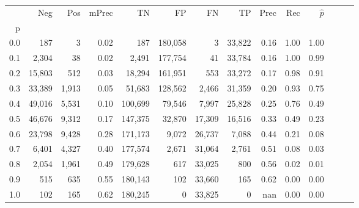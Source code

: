 \begin{tabular}{rrrrrrrrrrrrrr}
\toprule
{} &     Neg &    Pos & mPrec &       TN &       FP &      FN &      TP &  Prec &   Rec & $\hat{p}$ \\
p   &         &        &       &          &          &         &         &       &       &           \\
\midrule
0.0 &     187 &      3 &  0.02 &      187 &  180,058 &       3 &  33,822 &  0.16 &  1.00 &      1.00 \\
0.1 &   2,304 &     38 &  0.02 &    2,491 &  177,754 &      41 &  33,784 &  0.16 &  1.00 &      0.99 \\
0.2 &  15,803 &    512 &  0.03 &   18,294 &  161,951 &     553 &  33,272 &  0.17 &  0.98 &      0.91 \\
0.3 &  33,389 &  1,913 &  0.05 &   51,683 &  128,562 &   2,466 &  31,359 &  0.20 &  0.93 &      0.75 \\
0.4 &  49,016 &  5,531 &  0.10 &  100,699 &   79,546 &   7,997 &  25,828 &  0.25 &  0.76 &      0.49 \\
0.5 &  46,676 &  9,312 &  0.17 &  147,375 &   32,870 &  17,309 &  16,516 &  0.33 &  0.49 &      0.23 \\
0.6 &  23,798 &  9,428 &  0.28 &  171,173 &    9,072 &  26,737 &   7,088 &  0.44 &  0.21 &      0.08 \\
0.7 &   6,401 &  4,327 &  0.40 &  177,574 &    2,671 &  31,064 &   2,761 &  0.51 &  0.08 &      0.03 \\
0.8 &   2,054 &  1,961 &  0.49 &  179,628 &      617 &  33,025 &     800 &  0.56 &  0.02 &      0.01 \\
0.9 &     515 &    635 &  0.55 &  180,143 &      102 &  33,660 &     165 &  0.62 &  0.00 &      0.00 \\
1.0 &     102 &    165 &  0.62 &  180,245 &        0 &  33,825 &       0 &   nan &  0.00 &      0.00 \\
\bottomrule
\end{tabular}
